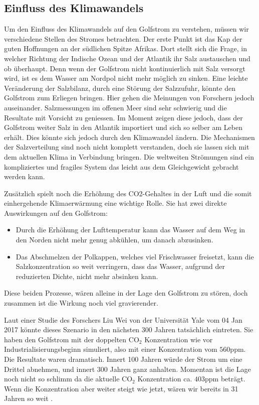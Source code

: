 \subsection{Einfluss des Klimawandels}\label{thermohalin:EinflussKlimawandel}
Um den Einfluss des Klimawandels auf den Golfstrom zu verstehen, müssen wir verschiedene Stellen des Stromes betrachten.
Der erste Punkt ist das Kap der guten Hoffnungen an der südlichen Spitze Afrikas.
Dort stellt sich die Frage, in welcher Richtung der Indische Ozean und der Atlantik ihr Salz austauschen und ob überhaupt. Denn wenn der Golfstrom nicht kontinuierlich mit Salz versorgt wird, ist es dem Wasser am Nordpol nicht mehr möglich zu sinken. Eine leichte Veränderung der Salzbilanz, durch eine Störung der Salzzufuhr,  könnte den Golfstrom zum Erliegen bringen. Hier gehen die Meinungen von Forschern jedoch auseinander. Salzmessungen im offenen Meer sind sehr schwierig und die Resultate mit Vorsicht zu geniessen.
Im Moment zeigen diese jedoch, dass der Golfstrom weiter Salz in den Atlantik importiert und sich so selber am Leben erhält. Dies könnte sich jedoch durch den Klimawandel ändern. Die Mechanismen der Salzverteilung sind noch nicht komplett verstanden, doch sie lassen sich mit dem aktuellen Klima in Verbindung bringen. Die weltweiten Strömungen sind ein kompliziertes und fragiles System das leicht aus dem Gleichgewicht gebracht werden kann. 

Zusätzlich spielt noch die Erhöhung des CO2-Gehaltes in der Luft und die somit einhergehende Klimaerwärmung eine wichtige Rolle. Sie hat zwei direkte Auswirkungen auf den Golfstrom:

\begin{itemize}
	\item Durch die Erhöhung der Lufttemperatur kann das Wasser auf dem Weg in den Norden nicht mehr genug abkühlen, um danach abzusinken.
	\item Das Abschmelzen der Polkappen, welches viel Frischwasser freisetzt, kann die Salzkonzentration so weit verringern, dass das Wasser, aufgrund der reduzierten Dichte, nicht mehr absinken kann.
\end{itemize}

Diese beiden Prozesse, wären alleine in der Lage den Golfstrom zu stören, doch zusammen ist die Wirkung noch viel gravierender.

Laut einer Studie des Forschers Liu Wei von der Universität Yale vom 04 Jan 2017 \cite{thermohalin:liuwei} könnte dieses Szenario in den nächsten 300 Jahren tatsächlich eintreten. Sie haben den Golfstrom mit der doppelten $\text{CO}_2$ Konzentration wie vor Industrialisierungsbeginn simuliert, also mit einer Konzentration vom $560\text{ppm}$. Die Resultate waren dramatisch. Innert 100 Jahren würde der Strom um eine Drittel abnehmen, und innert 300 Jahren ganz anhalten. Momentan ist die Lage noch nicht so schlimm da die aktuelle $\text{CO}_2$ Konzentration ca. $403\text{ppm}$\cite{thermohalin:c02} beträgt. Wenn die Konzentration aber weiter steigt wie jetzt, wären wir bereits in 31 Jahren so weit .

